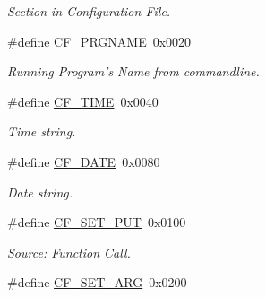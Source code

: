 \begin{CompactItemize}
\begin{CompactList}\small\item\em Section in Configuration File. \item\end{CompactList}\item 
\hypertarget{group__special__options__mask_g071c29b5177f2df2400712ce8daae9b0}{
\#define \hyperlink{group__special__options__mask_g071c29b5177f2df2400712ce8daae9b0}{CF\_\-PRGNAME}~0x0020}
\label{group__special__options__mask_g071c29b5177f2df2400712ce8daae9b0}

\begin{CompactList}\small\item\em Running Program's Name from commandline. \item\end{CompactList}\item 
\hypertarget{group__special__options__mask_g0fde537a92deb77f75b21c9e8d306509}{
\#define \hyperlink{group__special__options__mask_g0fde537a92deb77f75b21c9e8d306509}{CF\_\-TIME}~0x0040}
\label{group__special__options__mask_g0fde537a92deb77f75b21c9e8d306509}

\begin{CompactList}\small\item\em Time string. \item\end{CompactList}\item 
\hypertarget{group__special__options__mask_g1c5b511a34d2c0db6631539ba81a4386}{
\#define \hyperlink{group__special__options__mask_g1c5b511a34d2c0db6631539ba81a4386}{CF\_\-DATE}~0x0080}
\label{group__special__options__mask_g1c5b511a34d2c0db6631539ba81a4386}

\begin{CompactList}\small\item\em Date string. \item\end{CompactList}\item 
\hypertarget{group__special__options__mask_g8d6cd1608fef5638efe964da63edf2dd}{
\#define \hyperlink{group__special__options__mask_g8d6cd1608fef5638efe964da63edf2dd}{CF\_\-SET\_\-PUT}~0x0100}
\label{group__special__options__mask_g8d6cd1608fef5638efe964da63edf2dd}

\begin{CompactList}\small\item\em Source: Function Call. \item\end{CompactList}\item 
\hypertarget{group__special__options__mask_g1b3eb474a5160e5a32385f6de53d90d6}{
\#define \hyperlink{group__special__options__mask_g1b3eb474a5160e5a32385f6de53d90d6}{CF\_\-SET\_\-ARG}~0x0200}
\label{group__special__options__mask_g1b3eb474a5160e5a32385f6de53d90d6}


\end{CompactItemize}
